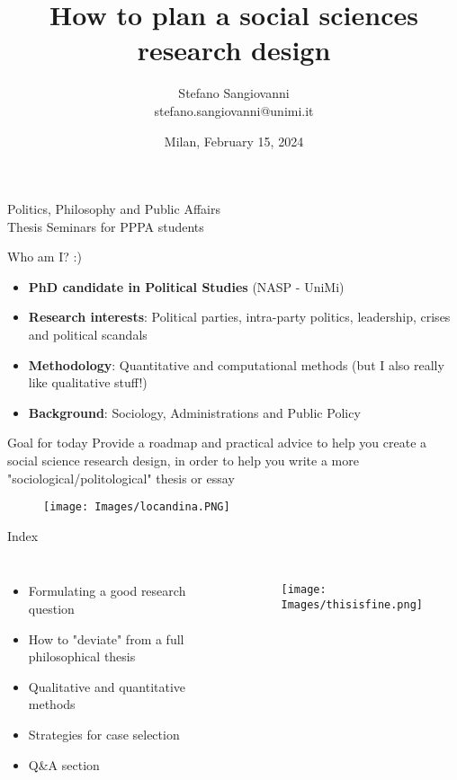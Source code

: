 \documentclass[10pt, aspectratio=169]{beamer}
\title{\textbf{How to plan a social sciences research design}}
\author{Stefano Sangiovanni \\ \vspace{0.1cm} \small stefano.sangiovanni@unimi.it}
\date{Milan, February 15, 2024}
\newcommand{\coursename}{Politics, Philosophy and Public Affairs  \\ Thesis Seminars for PPPA students}
\begin{document}
\begin{frame}[plain]
    \centering
    \vspace*{1em} 
    \footnotesize \coursename \\
    \titlepage
    \centering
\end{frame}



\begin{frame}{Who am I? :)}
\begin{itemize}
    \item \textbf{PhD candidate in Political Studies} (NASP - UniMi)
    \item \textbf{Research interests}: Political parties, intra-party politics, leadership, crises and political scandals
    \item \textbf{Methodology}: Quantitative and computational methods (but I also really like qualitative stuff!)
    \item \textbf{Background}: Sociology, Administrations and Public Policy 
\end{itemize}
\vspace{0.3cm}
\begin{block}{Goal for today}
\centering
Provide a roadmap and practical advice to help you create a social science research design, in order to help you write a more "sociological/politological" thesis or essay
\end{block}
\end{frame}


\begin{frame}[plain]
\begin{figure}
    \centering
    \texttt{[image: Images/locandina.PNG]}
\end{figure}
    
\end{frame}

\begin{frame}{Index}
\begin{columns}
\begin{itemize}
    \item Formulating a good research question \vspace{0.3cm}
    \item How to "deviate" from a full philosophical thesis \vspace{0.3cm}
    \item Qualitative and quantitative methods\vspace{0.3cm}
    \item Strategies for case selection\vspace{0.3cm}
    \item Q\&A section 
\end{itemize}
\begin{figure}
    \centering
    \texttt{[image: Images/thisisfine.png]}
    \label{fig:enter-label}
\end{figure}
\end{columns}
\end{frame}
\end{document}
